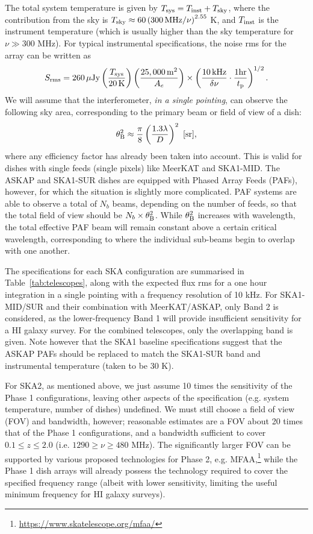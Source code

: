 \documentclass[useAMS,usenatbib]{mn2e}
\newcommand{\be}{\begin{equation}}
\newcommand{\ee}{\end{equation}}
\begin{document}
The total system temperature is given by $T_{\rm sys}=T_{\rm inst}+T_{\rm sky}$,
where the contribution from the sky is $T_{\rm sky}\approx 60 \left(300\, {\rm MHz}/\nu\right)^{2.55}$ K, and
$T_{\rm inst}$ is the instrument temperature (which is usually higher than the sky
temperature for $\nu \gg 300$ MHz). For typical instrumental specifications, the
noise rms for the array can be written as
\be \label{rms}
S_{\rm rms} = 260\, {\rm \mu Jy}\left(\frac{T_{\rm sys}}{20\, \rm K}\right)
 \left(\frac{25,000\, \rm m^2}{A_e}\right)\times \left(\frac{10 \,{\rm kHz}}{\delta\nu}\cdot \frac{1 {\rm hr}}{t_{\rm p}} \right)^{1/2}. \nonumber
\ee
We will assume that the interferometer, {\it in a single pointing}, can observe the following sky area, corresponding to the primary beam or field of view of a dish:
\begin{equation}
\theta_{\rm B}^2 \approx \frac{\pi}{8} \left (\frac{1.3 \lambda}{D} \right )^2\ [{\rm sr}],
\end{equation}
where any efficiency factor has already been taken into account. This is valid for dishes with single feeds (single pixels) like MeerKAT and SKA1-MID. The ASKAP and SKA1-SUR dishes are equipped with Phased Array Feeds (PAFs), however, for which the situation is slightly more complicated. PAF systems are able to observe a total of $N_b$ beams, depending on the number of feeds, so that the total field of view should be $N_b\times \theta_{\rm B}^2$. While $\theta_{\rm B}^2$ increases with wavelength, the total effective PAF beam will remain constant above a certain critical wavelength, corresponding to where the individual sub-beams begin to overlap with one another.

The specifications for each SKA configuration are summarised in Table~\ref{tab:telescopes}, along with the expected flux rms for a one hour integration in a single pointing with a frequency resolution of 10 kHz. For SKA1-MID/SUR and their combination with MeerKAT/ASKAP, only Band 2 is considered, as the lower-frequency Band 1 will provide insufficient sensitivity for a HI galaxy survey. For the combined telescopes, only the overlapping band is given. Note however that the SKA1 baseline specifications suggest that the ASKAP PAFs should be replaced to match the SKA1-SUR band and instrumental temperature (taken to be 30 K). 

For SKA2, as mentioned above, we just assume 10 times the sensitivity of the Phase 1 configurations, leaving other aspects of the specification (e.g. system temperature, number of dishes) undefined. We must still choose a field of view (FOV) and bandwidth, however; reasonable estimates are a FOV about 20 times that of the Phase 1 configurations, and a bandwidth sufficient to cover $0.1 \le z \le 2.0$ (i.e. $1290 \ge \nu \ge 480$ MHz). The significantly larger FOV can be supported by various proposed technologies for Phase 2, e.g. MFAA,\footnote{\url{https://www.skatelescope.org/mfaa/}} while the Phase 1 dish arrays will already possess the technology required to cover the specified frequency range (albeit with lower sensitivity, limiting the useful minimum frequency for HI galaxy surveys).
\end{document}
